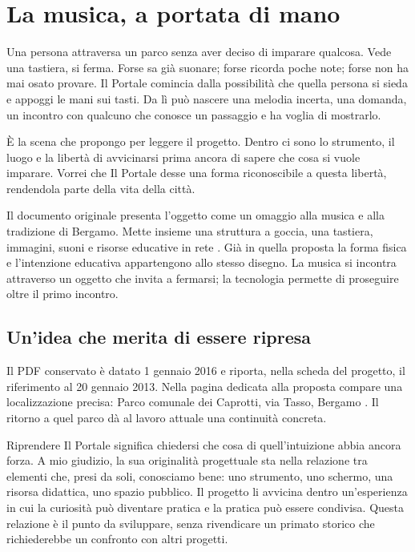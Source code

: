 \section{La musica, a portata di mano}\label{sec:origin}

Una persona attraversa un parco senza aver deciso di imparare qualcosa.
Vede una tastiera, si ferma. Forse sa già suonare; forse ricorda poche note;
forse non ha mai osato provare. Il Portale comincia dalla possibilità che
quella persona si sieda e appoggi le mani sui tasti. Da lì può nascere una
melodia incerta, una domanda, un incontro con qualcuno che conosce un
passaggio e ha voglia di mostrarlo.

È la scena che propongo per leggere il progetto. Dentro ci sono lo
strumento, il luogo e la libertà di avvicinarsi prima ancora di sapere
che cosa si vuole imparare. Vorrei che Il Portale desse una forma
riconoscibile a questa libertà, rendendola parte della vita della città.

Il documento originale presenta l'oggetto come un omaggio alla musica
e alla tradizione di Bergamo. Mette insieme una struttura a goccia,
una tastiera, immagini, suoni e risorse educative in rete
\cite[pp.~2--3]{terzi_peeragogy_2016}. Già in quella proposta la forma
fisica e l'intenzione educativa appartengono allo stesso disegno.
La musica si incontra attraverso un oggetto che invita a fermarsi;
la tecnologia permette di proseguire oltre il primo incontro.

\subsection{Un'idea che merita di essere ripresa}
Il PDF conservato è datato 1 gennaio 2016 e riporta, nella scheda del
progetto, il riferimento al 20 gennaio 2013. Nella pagina dedicata
alla proposta compare una localizzazione precisa: Parco comunale
dei Caprotti, via Tasso, Bergamo \cite[pp.~2 e 5]{terzi_peeragogy_2016}.
Il ritorno a quel parco dà al lavoro attuale una continuità concreta.

Riprendere Il Portale significa chiedersi che cosa di quell'intuizione
abbia ancora forza. A mio giudizio, la sua originalità progettuale sta
nella relazione tra elementi che, presi da soli, conosciamo bene:
uno strumento, uno schermo, una risorsa didattica, uno spazio pubblico.
Il progetto li avvicina dentro un'esperienza in cui la curiosità può
diventare pratica e la pratica può essere condivisa. Questa relazione
è il punto da sviluppare, senza rivendicare un primato storico che
richiederebbe un confronto con altri progetti.

